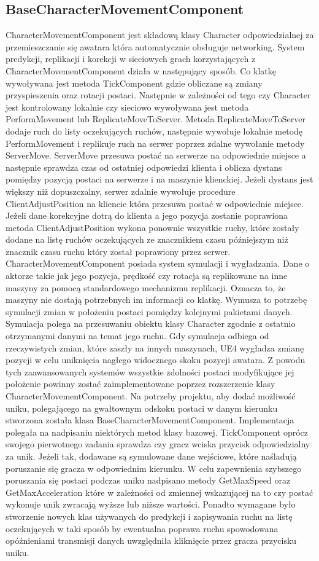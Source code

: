 \documentclass[multip]{SGGW-thesis}
\begin{document}
	\subsection{BaseCharacterMovementComponent}
	CharacterMovementComponent jest składową klasy Character odpowiedzialnej za przemieszczanie się awatara która automatycznie obsługuje networking.  System predykcji, replikacji i korekcji w sieciowych grach korzystających z CharacterMovementComponent działa w następujący sposób. Co klatkę wywoływana jest metoda TickComponent gdzie obliczane są zmiany przyspieszenia oraz rotacji postaci. Następnie  w zależności od tego czy Character jest kontrolowany lokalnie czy sieciowo wywoływana jest metoda PerformMovement lub ReplicateMoveToServer. Metoda ReplicateMoveToServer dodaje ruch do listy oczekujących ruchów, następnie wywołuje lokalnie metodę PerformMovement i replikuje ruch na serwer poprzez zdalne wywołanie metody ServerMove. ServerMove przesuwa postać na serwerze na odpowiednie miejsce a następnie sprawdza czas od ostatniej odpowiedzi klienta i oblicza dystans pomiędzy pozycją postaci na serwerze i na maszynie klienckiej. Jeżeli dystans jest większy niż dopuszczalny, serwer  zdalnie wywołuje procedure ClientAdjustPosition na kliencie która przesuwa postać w odpowiednie miejsce. Jeżeli dane korekcyjne dotrą do klienta a jego pozycja zostanie poprawiona metoda ClientAdjustPosition wykona ponownie wszystkie ruchy, które zostały dodane na listę ruchów oczekujących ze znacznikiem czasu późniejszym niż znacznik czasu ruchu który został poprawiony przez serwer.
	CharacterMovementComponent posiada system symulacji i wygładzania. Dane o aktorze takie jak jego pozycja, prędkość czy rotacja są replikowane na inne maszyny za pomocą standardowego mechanizmu replikacji. Oznacza to, że maszyny nie dostają potrzebnych im informacji co klatkę. Wymusza to potrzebę symulacji zmian w położeniu postaci pomiędzy kolejnymi pakietami danych. Symulacja polega na przesuwaniu obiektu klasy Character zgodnie z ostatnio otrzymanymi danymi na temat jego ruchu. Gdy symulacja odbiega od rzeczywistych zmian, które zaszły na innych maszynach, UE4 wygładza zmianę pozycji w celu uniknięcia nagłego widocznego skoku pozycji awatara.
	Z powodu tych zaawansowanych systemów wszystkie zdolności postaci modyfikujące jej położenie powinny zostać zaimplementowane poprzez rozszerzenie klasy CharacterMovementComponent.
Na potrzeby projektu, aby dodać możliwość uniku, polegającego na gwałtownym odskoku postaci w danym kierunku stworzona została klasa BaseCharacterMovementComponent. Implementacja polegała na nadpisaniu niektórych metod klasy bazowej. TickComponent oprócz swojego pierwotnego zadania sprawdza czy gracz wciska przycisk odpowiedzialny za unik. Jeżeli tak, dodawane są symulowane dane wejściowe, które naśladują poruszanie się gracza w odpowiednim kierunku. W celu zapewnienia szybszego poruszania się postaci podczas uniku nadpisano metody GetMaxSpeed oraz GetMaxAcceleration które w zależności od zmiennej wskazującej na to czy postać wykonuje unik zwracają wyższe lub niższe wartości. Ponadto wymagane było stworzenie nowych klas używanych do predykcji i zapisywania ruchu na listę oczekujących w taki sposób by ewentualna poprawa ruchu spowodowana opóźnieniami transmisji danych uwzględniła kliknięcie przez gracza przycisku uniku.
\end{document}
